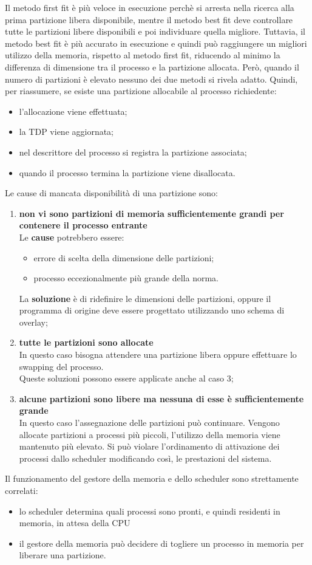 \documentclass[12pt, letterpaper]{report}
\begin{document}
	Il metodo first fit è più veloce in esecuzione perchè si arresta nella ricerca alla prima partizione libera disponibile, mentre il metodo best fit deve controllare tutte le partizioni libere disponibili e poi individuare quella migliore. Tuttavia, il metodo best fit è più accurato in esecuzione e quindi può raggiungere un migliori utilizzo della memoria, rispetto al metodo first fit, riducendo al minimo la differenza di dimensione tra il processo e la partizione allocata. Però, quando il numero di partizioni è elevato nessuno dei due metodi si rivela adatto.
	Quindi, per riassumere, se esiste una partizione allocabile al processo richiedente:
	\begin{itemize}
		\item l'allocazione viene effettuata;
		\item la TDP viene aggiornata;
		\item nel descrittore del processo si registra la partizione associata;
		\item quando il processo termina la partizione viene disallocata.
	\end{itemize}
	Le cause di mancata disponibilità di una partizione sono:
	\begin{enumerate}
		\item \textbf{non vi sono partizioni di memoria sufficientemente grandi per contenere il processo entrante} \\
		Le \textbf{cause} potrebbero essere:
		\begin{itemize}
			\item errore di scelta della dimensione delle partizioni;
			\item processo eccezionalmente più grande della norma.
		\end{itemize}
		La \textbf{soluzione} è di ridefinire le dimensioni delle partizioni, oppure il programma di origine deve essere progettato utilizzando uno schema di overlay;
		\item \textbf{tutte le partizioni sono allocate} \\
		In questo caso bisogna attendere una partizione libera oppure effettuare lo swapping del processo. \\
		Queste soluzioni possono essere applicate anche al caso 3;
		\item \textbf{alcune partizioni sono libere ma nessuna di esse è sufficientemente grande} \\
		In questo caso l'assegnazione delle partizioni può continuare. Vengono allocate partizioni a processi più piccoli, l'utilizzo della memoria viene mantenuto più elevato. Si può violare l'ordinamento di attivazione dei processi dallo scheduler modificando così, le prestazioni del sistema.
	\end{enumerate}
	Il funzionamento del gestore della memoria e dello scheduler sono strettamente correlati:
	\begin{itemize}
		\item lo scheduler determina quali processi sono pronti, e quindi residenti in memoria, in attesa della CPU
		\item il gestore della memoria può decidere di togliere un processo in memoria per liberare una partizione.
	\end{itemize}
\end{document}
